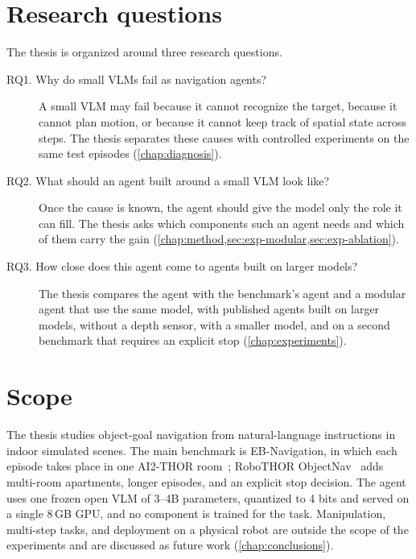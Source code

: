 \section{Research questions}
\label{sec:intro-rq}
The thesis is organized around three research questions.
\begin{description}
\item[RQ1. Why do small VLMs fail as navigation agents?] A small VLM may fail because it cannot recognize the
target, because it cannot plan motion, or because it cannot keep track of spatial state across steps. The thesis
separates these causes with controlled experiments on the same test episodes (\cref{chap:diagnosis}).
\item[RQ2. What should an agent built around a small VLM look like?] Once the cause is known, the agent should give
the model only the role it can fill. The thesis asks which components such an agent needs and which of them carry
the gain (\cref{chap:method,sec:exp-modular,sec:exp-ablation}).
\item[RQ3. How close does this agent come to agents built on larger models?] The thesis compares the agent with the
benchmark's agent and a modular agent that use the same model, with published agents built on larger
models, without a depth sensor, with a smaller model, and on a second benchmark that requires an explicit stop
(\cref{chap:experiments}).
\end{description}

\section{Scope}
\label{sec:intro-scope}
The thesis studies object-goal navigation from natural-language instructions in indoor simulated scenes. The main
benchmark is EB-Navigation, in which each episode takes place in one AI2-THOR room~\cite{kolve2017ai2thor}; RoboTHOR
ObjectNav~\cite{deitke2020robothor} adds multi-room apartments, longer episodes, and an explicit stop decision. The
agent uses one frozen open VLM of 3--4B parameters, quantized to 4 bits and served on a single 8\,GB GPU, and no
component is trained for the task. Manipulation, multi-step tasks, and deployment on a physical robot are outside
the scope of the experiments and are discussed as future work (\cref{chap:conclusions}).

